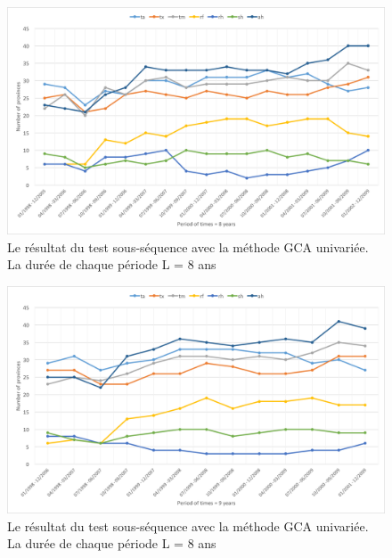 \begin{figure}[h]
\begin{center}
\includegraphics[width = \linewidth]{../figures/chap5/uni_8.png}
\caption{Le résultat du test sous-séquence avec la méthode GCA univariée. La durée de chaque période L = 8 ans }
\label{fig_uni8}	
\end{center}
\end{figure}

\begin{figure}[h]
\begin{center}
\includegraphics[width = \linewidth]{../figures/chap5/uni_9.png}
\caption{Le résultat du test sous-séquence avec la méthode GCA univariée. La durée de chaque période L = 8 ans }
\label{fig_uni9}	
\end{center}
\end{figure}



